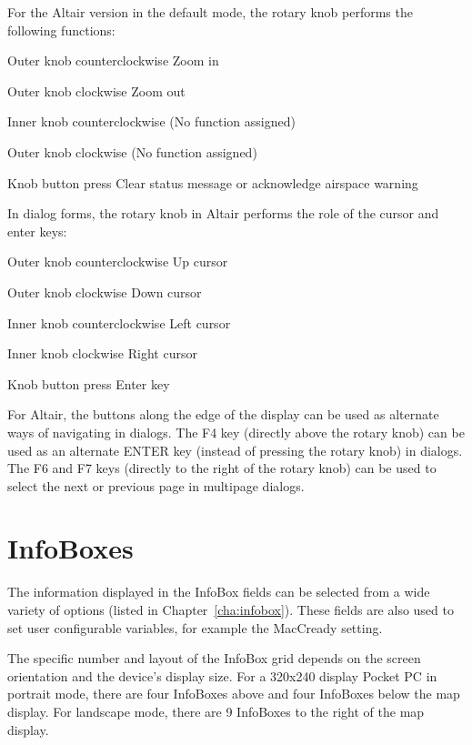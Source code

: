 \documentclass[a4paper,12pt]{refrep}
\newcommand{\InfoBox}[0]{{InfoBox}}
\begin{document}
For the Altair version in the default mode, the rotary knob performs
the following functions:
\begin{jspecs}
\item[Outer knob counterclockwise] Zoom in
\item[Outer knob clockwise] Zoom out
\item[Inner knob counterclockwise] (No function assigned)
\item[Outer knob clockwise] (No function assigned)
\item[Knob button press] Clear status message or acknowledge airspace warning
\end{jspecs}
In dialog forms, the rotary knob in Altair performs the role of the cursor and
enter keys:
\begin{jspecs}
\item[Outer knob counterclockwise] Up cursor
\item[Outer knob clockwise] Down cursor
\item[Inner knob counterclockwise] Left cursor
\item[Inner knob clockwise] Right cursor
\item[Knob button press] Enter key
\end{jspecs}

For Altair, the buttons along the edge of the display can be used as
alternate ways of navigating in dialogs.  The F4 key (directly above
the rotary knob) can be used as an alternate ENTER key (instead of
pressing the rotary knob) in dialogs.  The F6 and F7 keys (directly to
the right of the rotary knob) can be used to select the next or
previous page in multipage dialogs.

\section{{\InfoBox}es}

The information displayed in the {\InfoBox} fields can be selected from a
wide variety of options (listed in Chapter~\ref{cha:infobox}).  These
fields are also used to set user configurable variables, for example
the MacCready setting.

The specific number and layout of the {\InfoBox} grid depends on the
screen orientation and the device's display size.  For a 320x240 display
Pocket PC in portrait mode, there are four {\InfoBox}es above and four
{\InfoBox}es below the map display.  For landscape mode, there are 9
InfoBoxes to the right of the map display.
\end{document}
